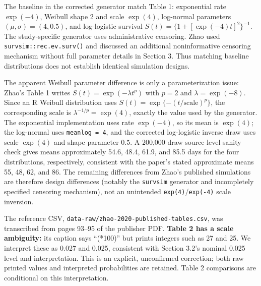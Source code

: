\documentclass[
  12pt]{article}
\begin{document}
The baseline in the corrected generator match Table 1: exponential rate
\(\exp(-4)\), Weibull shape 2 and scale \(\exp(4)\), log-normal
parameters \((\mu,\sigma)=(4,0.5)\), and log-logistic survival
\(S(t)=\{1+[\exp(-4)t]^2\}^{-1}\). The study-specific generator uses
administrative censoring. Zhao used \texttt{survsim::rec.ev.surv()}
\citep{survsim} and discussed an additional noninformative censoring
mechanism without full parameter details in Section 3. Thus matching
baseline distributions does not establish identical simulation designs.

The apparent Weibull parameter difference is only a parameterization
issue: Zhao's Table 1 writes \(S(t)=\exp(-\lambda t^p)\) with \(p=2\)
and \(\lambda=\exp(-8)\). Since an R Weibull distribution uses
\(S(t)=\exp\{-(t/\text{scale})^p\}\), the corresponding scale is
\(\lambda^{-1/p}=\exp(4)\), exactly the value used by the generator. The
exponential implementation uses rate \(\exp(-4)\), so its mean is
\(\exp(4)\); the log-normal uses \texttt{meanlog\ =\ 4}, and the
corrected log-logistic inverse draw uses scale \(\exp(4)\) and shape
parameter \(0.5\). A 200,000-draw source-level sanity check gives means
approximately 54.6, 48.4, 61.9, and 85.5 days for the four
distributions, respectively, consistent with the paper's stated
approximate means 55, 48, 62, and 86. The remaining differences from
Zhao's published simulations are therefore design differences (notably
the \texttt{survsim} generator and incompletely specified censoring
mechanism), not an unintended \texttt{exp(4)}/\texttt{exp(-4)} scale
inversion.

The reference CSV, \texttt{data-raw/zhao-2020-published-tables.csv}, was
transcribed from pages 93--95 of the publisher PDF. \textbf{Table 2 has
a scale ambiguity:} its caption says ``(*100)'' but prints integers such
as 27 and 25. We interpret these as 0.027 and 0.025, consistent with
Section 3.2's nominal 0.025 level and interpretation. This is an
explicit, unconfirmed correction; both raw printed values and
interpreted probabilities are retained. Table 2 comparisons are
conditional on this interpretation.
\end{document}
